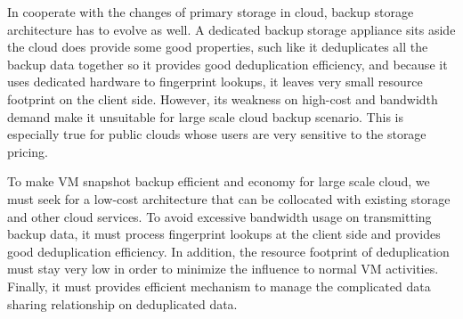 In cooperate with the changes of primary storage in cloud, backup storage architecture
has to evolve as well. A dedicated backup storage appliance sits aside the cloud does provide some good properties,
such like it deduplicates all the backup data together so it provides good deduplication efficiency,
 and because it uses dedicated hardware to fingerprint lookups, it leaves very small resource footprint on the client side.
However, its weakness on high-cost and bandwidth demand make it unsuitable for large scale cloud
backup scenario. This is especially true for public clouds whose users are very sensitive
to the storage pricing. 

To make VM snapshot backup efficient and economy for large scale cloud, 
we must seek for a low-cost architecture that can be collocated with existing
storage and other cloud services. To avoid excessive bandwidth usage on transmitting 
backup data, it must process fingerprint lookups at the client side and provides
good deduplication efficiency. In addition, the resource footprint of deduplication must stay
very low in order to minimize the influence to normal VM activities. Finally, it must provides
efficient mechanism to manage the complicated data sharing relationship on deduplicated data.




